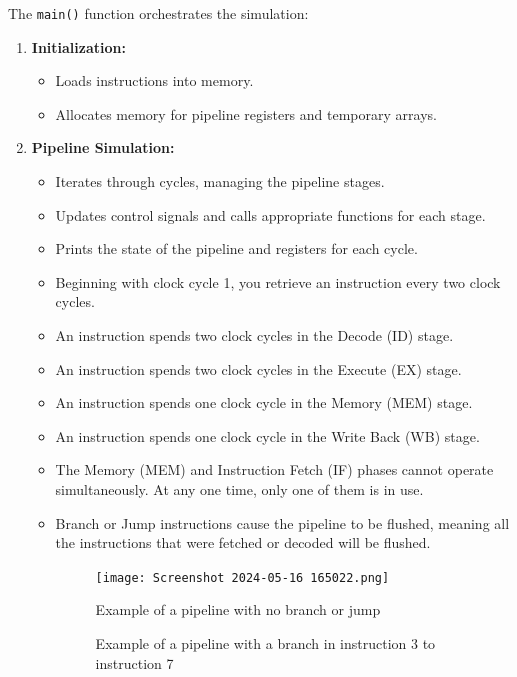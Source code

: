 \documentclass{article}
\begin{document}
The \texttt{main()} function orchestrates the simulation:
\begin{enumerate}
    \item \textbf{Initialization:}
    \begin{itemize}
        \item Loads instructions into memory.
        \item Allocates memory for pipeline registers and temporary arrays.
    \end{itemize}
    \item \textbf{Pipeline Simulation:}
    \begin{itemize}
        \item Iterates through cycles, managing the pipeline stages.
        \item Updates control signals and calls appropriate functions for each stage.
        \item Prints the state of the pipeline and registers for each cycle.
        \item Beginning with clock cycle 1, you retrieve an instruction every two clock cycles.
        \item An instruction spends two clock cycles in the Decode (ID) stage.
        \item An instruction spends two clock cycles in the Execute (EX) stage.
        \item An instruction spends one clock cycle in the Memory (MEM) stage.
        \item An instruction spends one clock cycle in the Write Back (WB) stage.

       
        
        \item The Memory (MEM) and Instruction Fetch (IF) phases cannot operate simultaneously. At any one time, only one of them is in use.
        \item Branch or Jump instructions cause the pipeline to be flushed, meaning all the instructions that were fetched or decoded will be flushed. 
        
         \begin{figure}[H]
        \caption{Example of a pipeline with no branch or jump}

        \texttt{[image: Screenshot 2024-05-16 165022.png]}

        \end{figure}

        \begin{figure}[H]
        \caption{Example of a pipeline with a branch in instruction 3 to instruction 7}
        


\end{figure}
\end{itemize}
\end{enumerate}
\end{document}
